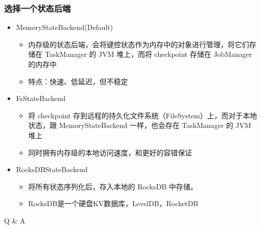 \documentclass{beamer}
\begin{document}
  \begin{frame}
      \frametitle{选择一个状态后端}
  
      \begin{itemize}
          \item MemoryStateBackend(Default)
          \begin{itemize}
              \item 内存级的状态后端，会将键控状态作为内存中的对象进行管理，将它们存储在 TaskManager 的 JVM 堆上，而将 checkpoint 存储在 JobManager 的内存中
              \item 特点：快速、低延迟，但不稳定
          \end{itemize}
          \item FsStateBackend
          \begin{itemize}
              \item 将 checkpoint 存到远程的持久化文件系统（FileSystem）上，而对于本地状态，跟 MemoryStateBackend 一样，也会存在 TaskManager 的 JVM 堆上
              \item 同时拥有内存级的本地访问速度，和更好的容错保证              
          \end{itemize}
          \item RocksDBStateBackend
          \begin{itemize}
              \item 将所有状态序列化后，存入本地的 RocksDB 中存储。
              \item RocksDB是一个硬盘KV数据库，LevelDB，RocketDB
          \end{itemize}
      \end{itemize}
  
  \end{frame}

  \begin{frame}[plain,c]
    
    \begin{center}
    \Huge Q \& A
    \end{center}
    
  \end{frame}
\end{document}
